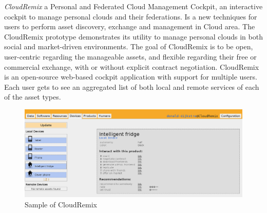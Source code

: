 	\emph{CloudRemix\cite{spillner2013personal}} a Personal and Federated Cloud Management Cockpit, an interactive cockpit to manage personal clouds and their federations. Is a new techniques for users to perform asset discovery, exchange and management in Cloud area. The CloudRemix prototype demonstrates its utility to manage personal clouds in both social and market-driven environments. The goal of CloudRemix is to be open, user-centric regarding the manageable assets, and flexible regarding their free or commercial exchange, with or without explicit contract negotiation. CloudRemix is an open-source web-based cockpit application with support for multiple users. Each user gets to see an aggregated list of both local and remote services of each of the asset types.
	    \begin{figure}[!ht]
		\centering
		\includegraphics[scale=0.6]{Material/examples/CloudRemix.png}   
		\caption[Sample of CloudRemix]{Sample of CloudRemix}                  
		\end{figure} 

